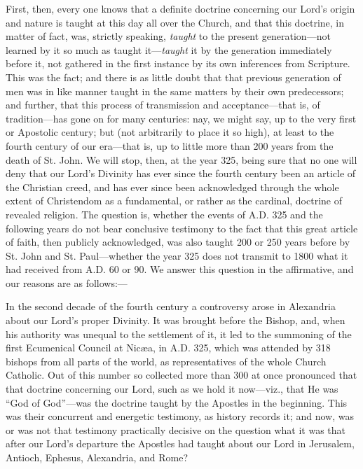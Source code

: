 First, then, every one knows that a definite
doctrine concerning our Lord's origin and nature is taught at this day
all over the Church, and that this doctrine, in matter of fact, was,
strictly speaking, \emph{taught} to the present generation—not
learned by it so much as taught it—\emph{taught} it by the
generation immediately before it, not gathered in the first instance
by its own inferences from Scripture. This was the fact; and there is
as little doubt that that previous generation of men was in like
manner taught in the same matters by their own predecessors; and
further, that this process of transmission and acceptance—that is,
of tradition—has gone on for many centuries: nay, we might say, up
to the very first or Apostolic century; but (not arbitrarily to place
it so high), at least to the fourth century of our era—that is, up
to little more than 200 years from the death of St. John. We will
stop, then, at the year 325, being sure that no one will deny that our
Lord's Divinity has ever since the fourth century been an article of
the Christian creed, and has ever since been acknowledged through the
whole extent of Christendom as a fundamental, or rather as the
cardinal, doctrine of revealed religion. The question is, whether the
events of A.D. 325 and the
following years do not bear conclusive testimony to the fact that this
great article of faith, then publicly acknowledged, was also
taught 200 or 250 years before by St. John and St. Paul—whether the
year 325 does not transmit to 1800 what it had received from A.D.
60 or 90. We answer this question in the affirmative, and our reasons
are as follows:—

In the second decade of the fourth century a
controversy arose in Alexandria about our Lord's proper Divinity. It
was brought before the Bishop, and, when his authority was unequal to
the settlement of it, it led to the summoning of the first Ecumenical
Council at Nicæa, in A.D. 325,
which was attended by 318 bishops from all parts of the world, as
representatives of the whole Church Catholic. Out of this number so
collected more than 300 at once pronounced that that doctrine
concerning our Lord, such as we hold it now—viz., that He was ``God
of God''—was the doctrine taught by the Apostles in the beginning.
This was their concurrent and energetic testimony, as history records
it; and now, was or was not that testimony practically decisive on the
question what it was that after our Lord's departure the Apostles had
taught about our Lord in Jerusalem, Antioch, Ephesus, Alexandria, and
Rome?

